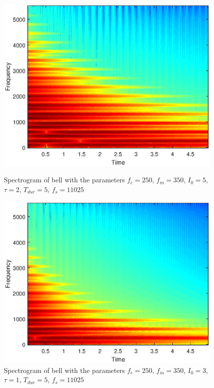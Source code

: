 \documentclass{article}
\begin{document}
\begin{figure}[H]
	\centering
	\begin{minipage}{0.3\linewidth}
		\includegraphics[scale=0.3]{spec5}
		\caption{Spectrogram of bell with the parameters $f_c = 250$, $f_m = 350$, $I_0 = 5$, $\tau = 2$, $T_{dur} = 5$, $f_s = 11025$}
	\end{minipage}
	\hspace{4cm}
	\begin{minipage}{0.3\linewidth}
		\includegraphics[scale=0.3]{spec6}
		\caption{Spectrogram of bell with the parameters $f_c = 250$, $f_m = 350$, $I_0 = 3$, $\tau = 1$, $T_{dur} = 5$, $f_s = 11025$}
	\end{minipage}
\end{figure}
\end{document}
